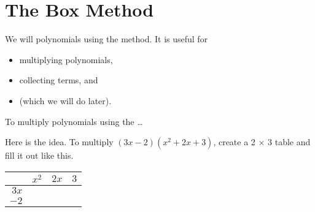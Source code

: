 \section{The Box Method}

We will  polynomials using the  method.
It is useful for
\begin{itemize}[nosep]
    \item multiplying  polynomials,
    \item collecting  terms, and 
    \item {} (which we will do later).
\end{itemize}
\vspace{1\baselineskip}

\begin{myConceptSteps}{To multiply polynomials using the \dots}
\end{myConceptSteps}

Here is the idea. To multiply $(3x-2)(x^2 + 2x + 3)$, 
create a 2 $\times$ 3 table and fill it out like this.

\begin{center}
    \Large
    \renewcommand{\arraystretch}{1.5}
    \begin{tabular}{r||p{0.75in}|p{0.75in}|p{0.75in}|}
        & $x^2$ & $2x$ & $3$ \\
        \hline\hline
        $3x$ & & & \\ 
        \hline
        $-2$ & & & \\
        \hline
    \end{tabular}
\end{center}
